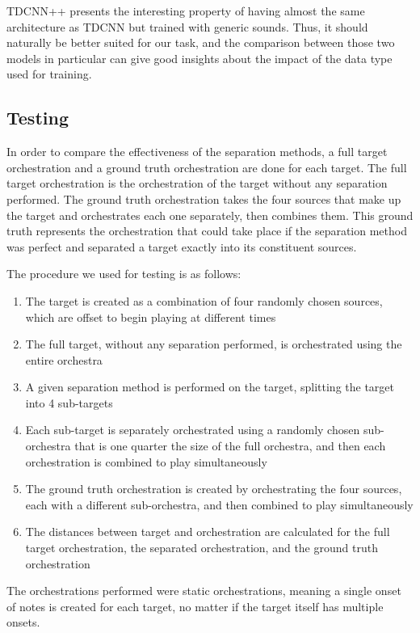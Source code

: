 \documentclass{article}
\begin{document}
			TDCNN++ presents the interesting property of having almost the same architecture as TDCNN but trained with generic sounds. Thus, it should naturally be better suited for our task, and the comparison between those two models in particular can give good insights about the impact of the data type used for training.
	
		\subsection{Testing}
		In order to compare the effectiveness of the separation methods, a full target orchestration and a ground truth orchestration are done for each target. The full target orchestration is the orchestration of the target without any separation performed. The ground truth orchestration takes the four sources that make up the target and orchestrates each one separately, then combines them. This ground truth represents the orchestration that could take place if the separation method was perfect and separated a target exactly into its constituent sources. 
		
		The procedure we used for testing is as follows:
		\begin{enumerate}
			\item The target is created as a combination of four randomly chosen sources, which are offset to begin playing at different times
			\item The full target, without any separation performed, is orchestrated using the entire orchestra
			\item A given separation method is performed on the target, splitting the target into 4 sub-targets
			\item Each sub-target is separately orchestrated using a randomly chosen sub-orchestra that is one quarter the size of the full orchestra, and then each orchestration is combined to play simultaneously
			\item The ground truth orchestration is created by orchestrating the four sources, each with a different sub-orchestra, and then combined to play simultaneously
			\item The distances between target and orchestration are calculated for the full target orchestration, the separated orchestration, and the ground truth orchestration 
		\end{enumerate}	
		
		The orchestrations performed were static orchestrations, meaning a single onset of notes is created for each target, no matter if the target itself has multiple onsets.			
		
\end{document}
